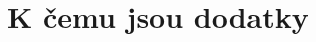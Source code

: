 \documentclass[../main.tex]{subfiles}
\begin{document}
\section{K čemu jsou dodatky}
\label{sec:kcemudodatky}
\end{document}
